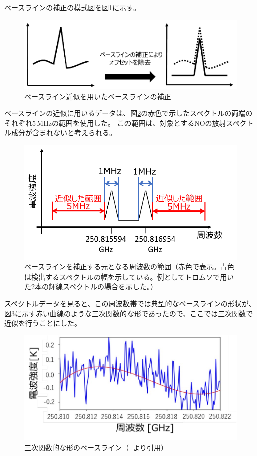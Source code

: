 ベースラインの補正の模式図を図\ref{fig:baseline_correct_schema}に示す。
\begin{figure}[htbp]
    \centering
    \includegraphics[width=\linewidth]{master_thesis_contents/master_thesis_fig/baseline_correct_schema.pdf}
    \caption{ベースライン近似を用いたベースラインの補正}
    \label{fig:baseline_correct_schema}
\end{figure}
ベースラインの近似に用いるデータは、図\ref{fig:baseline_range}の赤色で示したスペクトルの両端のそれぞれ$5\, \mathrm{MHz}$の範囲を使用した。
この範囲は、対象とするNOの放射スペクトル成分が含まれないと考えられる。
\begin{figure}[htbp]
    \centering
    \includegraphics[width=\linewidth]{master_thesis_contents/master_thesis_fig/baseline_range.pdf}
    \caption{ベースラインを補正する元となる周波数の範囲（赤色で表示。青色は検出するスペクトルの幅を示している。例としてトロムソで用いた2本の輝線スペクトルの場合を示した。）}
    \label{fig:baseline_range}
\end{figure}
スペクトルデータを見ると、この周波数帯では典型的なベースラインの形状が、図\ref{fig:baseline_curve}に示す赤い曲線のような三次関数的な形であったので、ここでは三次関数で近似を行うことにした。
\begin{figure}[htbp]
    \centering
    \includegraphics[width=\linewidth]{master_thesis_contents/master_thesis_fig/baseline_curve.pdf}
    \caption{三次関数的な形のベースライン（~\cite{goto2021bachelor}より引用）}
    \label{fig:baseline_curve}
\end{figure}
